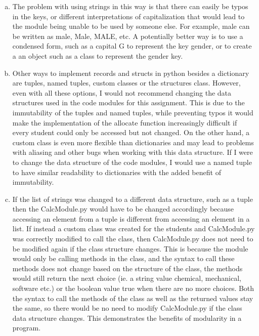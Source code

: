 \documentclass[12pt]{article}
\begin{document}
\begin{enumerate}[(a)]
\newpage

\item The problem with using strings in this way is that there can easily be typos in the keys, or different interpretations of capitalization that would lead to the module being unable to be used by someone else. For example, male can be written as male, Male, MALE, etc. A potentially better way is to use a condensed form, such as a capital G to represent the key gender, or to create a an object such as a class to represent the gender key. 

\item Other ways to implement records and structs in python besides a dictionary are tuples, named tuples, custom classes or the structures class.  However, even with all these options, I would not recommend changing the data structures used in the code modules for this assignment. This is due to the immutability of the tuples and named tuples, while preventing typos it would make the implementation of the allocate function increasingly difficult if every student could only be accessed but not changed. On the other hand, a custom class is even more flexible than dictionaries and may lead to problems with aliasing and other bugs when working with this data structure. If I were to change the data structure of the code modules, I would use a named tuple to have similar readability to dictionaries with the added benefit of immutability.

\item If the list of strings was changed to a different data structure, such as a tuple then the CalcModule.py would have to be changed accordingly because accessing an element from a tuple is different from accessing an element in a list. If instead a custom class was created for the students and CalcModule.py was correctly modified to call the class, then CalcModule.py does not need to be modified again if the class structure changes. This is because the module would only be calling methods in the class, and the syntax to call these methods does not change based on the structure of the class, the methods would still return the next choice (ie. a string value chemical, mechanical, software etc.) or the boolean value true when there are no more choices. Both the syntax to call the methods of the class as well as the returned values stay the same, so there would be no need to modify CalcModule.py if the class data structure changes.  This demonstrates the benefits of modularity in a program.

\end{enumerate}
\end{document}
